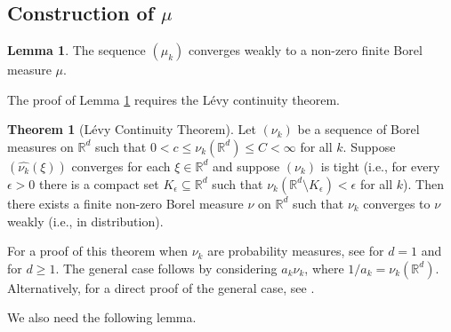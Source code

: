 \documentclass{amsart}
\numberwithin{equation}{section}
\theoremstyle{definition}
\newtheorem{thm}[theorem]{Theorem}
\newtheorem{lemma}[theorem]{Lemma}
\theoremstyle{definition}
\def\RR{\mathbb{R}}
\begin{document}
\subsection{Construction of  \texorpdfstring{$\mu$}{mu}}




\begin{lemma}\label{weakconv}
The sequence $(\mu_k)$ converges weakly to a non-zero finite Borel measure $\mu$. 
\end{lemma}

The proof of Lemma \ref{weakconv} requires the Lévy continuity theorem. \begin{thm}[Lévy Continuity Theorem]\label{Levy}
Let $(\nu_k)$ be a sequence of Borel measures on $\RR^d$ such that $0 < c \leq \nu_k(\RR^d) \leq C < \infty$ for all $k$. 
Suppose $(\widehat{\nu_k}(\xi))$ converges for each $\xi \in \RR^d$ 
and 
suppose $(\nu_k)$ is tight (i.e., for every $\epsilon>0$ there is a compact set $K_{\epsilon} \subseteq \RR^d$ such that $\nu_k(\RR^d \setminus K_{\epsilon}) < \epsilon$ for all $k$). Then there exists a finite non-zero Borel measure $\nu$ on $\RR^d$ such that $\nu_k$ converges to $\nu$ weakly (i.e., in distribution). 
\end{thm}

For a proof of this theorem when $\nu_k$ are probability measures, see  \cite[Section 26]{billingsley} for $d=1$ and \cite[Section 26]{billingsley} for $d \geq 1$. The general case follows by considering $a_k\nu_k$,  where $1/a_k = \nu_k(\RR^d)$. 
Alternatively, for a direct proof of the general case, see \cite[Section 8.8]{bogachev}. 

We also need the following lemma. 
\end{document}
